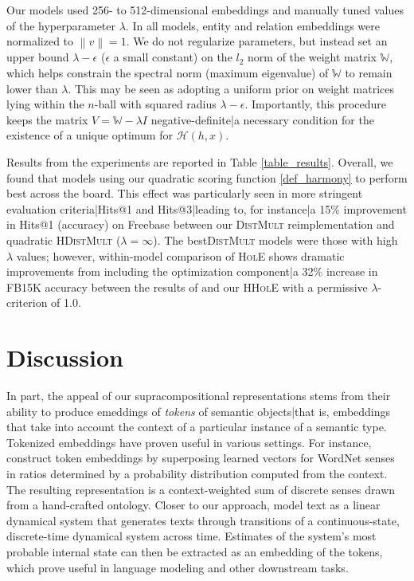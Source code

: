 \documentclass[a4paper,10pt]{article}
\newcommand{\norm}[1]{\left\lVert #1 \right\rVert}
\begin{document}
Our models used 256- to 512-dimensional embeddings and manually tuned values of the hyperparameter $\lambda$. In all models, entity and relation embeddings were normalized to $\norm{v} = 1$. We do not regularize parameters, but instead set an upper bound $\lambda - \epsilon$ ($\epsilon$ a small constant) on the $l_2$ norm of the weight matrix $\mathbb{W}$, which helps constrain the spectral norm (maximum eigenvalue) of $\mathbb{W}$ to remain lower than $\lambda$. This may be seen as adopting a uniform prior on weight matrices lying within the $n$-ball with squared radius $\lambda - \epsilon$. Importantly, this procedure keeps the matrix $V = \mathbb{W} - \lambda I$ negative-definite|a necessary condition for the existence of a unique optimum for $\mathcal{H}(h,x)$. 

Results from the experiments are reported in Table \ref{table_results}. 
Overall, we found that models using our quadratic scoring function \ref{def_harmony} to perform best across the board. This effect was particularly seen in more stringent evaluation criteria|Hits@1 and Hits@3|leading to, for instance|a 15\% improvement in Hits@1 (accuracy) on Freebase between our \textsc{DistMult} reimplementation and quadratic \textsc{HDistMult} ($\lambda = \infty$). The best\textsc{DistMult} models were those with high $\lambda$ values; however, within-model comparison of \textsc{HolE} shows dramatic improvements from including the optimization component|a 32\% increase in FB15K accuracy between the results of \citep{nickel2016hole} and our \textsc{HHolE} with a permissive $\lambda$-criterion of 1.0. 

\section{Discussion} \label{sec_discussion}

In part, the appeal of our supracompositional representations stems from their ability to produce emeddings of \emph{tokens} of semantic objects|that is, embeddings that take into account the context of a particular instance of a semantic type. Tokenized embeddings have proven useful in various settings. For instance, \citet{dasigi2017tokenembeddings} construct token embeddings by superposing learned vectors for WordNet senses in ratios determined by a probability distribution computed from the context. The resulting representation is a context-weighted sum of discrete senses drawn from a hand-crafted ontology. Closer to our approach, \citet{belanger2015lds} model text as a linear dynamical system that generates texts through transitions of a continuous-state, discrete-time dynamical system across time. Estimates of the system's most probable internal state can then be extracted as an embedding of the tokens, which prove useful in language modeling and other downstream tasks.
\end{document}
